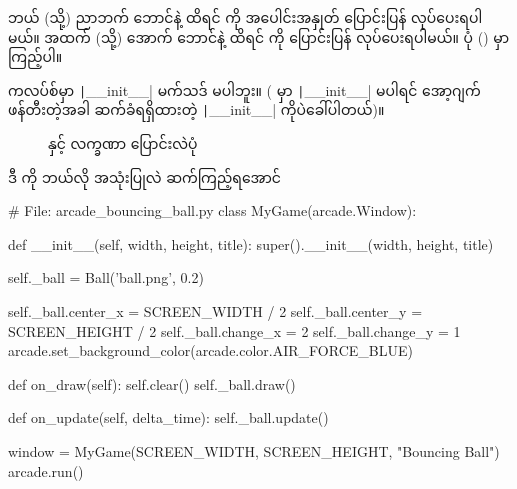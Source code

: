 ဘယ် (သို့) ညာဘက် ဘောင်နဲ့ ထိရင်  ကို အပေါင်းအနှုတ် ပြောင်းပြန် လုပ်ပေးရပါမယ်။ အထက် (သို့) အောက် ဘောင်နဲ့ ထိရင်  ကို ပြောင်းပြန် လုပ်ပေးရပါမယ်။ ပုံ (\fRefNo{\ref{fig:ch10bouncing}}) မှာ ကြည့်ပါ။

 ကလပ်စ်မှာ \texttt|__init__| မက်သဒ် မပါဘူး။ ( မှာ \texttt|__init__| မပါရင် အော့ဂျက်ဖန်တီးတဲ့အခါ ဆက်ခံရရှိထားတဲ့  \texttt|__init__| ကိုပဲခေါ်ပါတယ်)။ 

\begin{figure}[tbh!]
\caption{ နှင့်  လက္ခဏာ ပြောင်းလဲပုံ} 
\label{fig:ch10bouncing}
\end{figure}



ဒီ  ကို ဘယ်လို အသုံးပြုလဲ ဆက်ကြည့်ရအောင် 
%
%
\begin{py}
# File: arcade_bouncing_ball.py
class MyGame(arcade.Window):

    def __init__(self, width, height, title):
        super().__init__(width, height, title)

        self._ball = Ball('ball.png', 0.2)

        self._ball.center_x = SCREEN_WIDTH / 2
        self._ball.center_y = SCREEN_HEIGHT / 2
        self._ball.change_x = 2
        self._ball.change_y = 1
        arcade.set_background_color(arcade.color.AIR_FORCE_BLUE)

    def on_draw(self):
        self.clear()
        self._ball.draw()

    def on_update(self, delta_time):
        self._ball.update()


window = MyGame(SCREEN_WIDTH, SCREEN_HEIGHT, "Bouncing Ball")
arcade.run()
\end{py}
%

